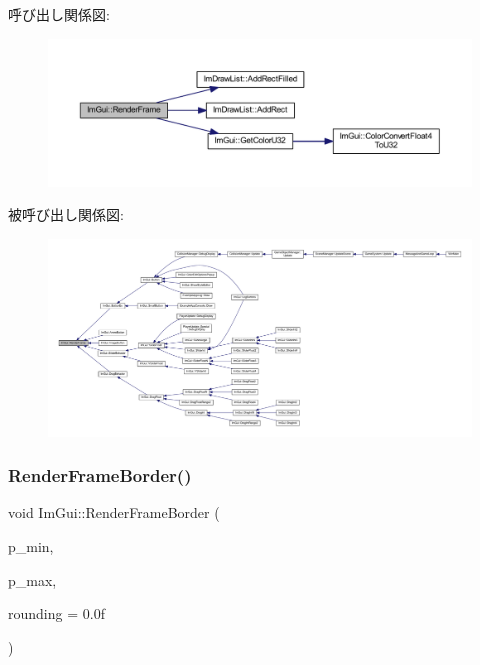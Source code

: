 呼び出し関係図\+:\nopagebreak
\begin{figure}[H]
\begin{center}
\leavevmode
\includegraphics[width=350pt]{namespace_im_gui_a621ba649568ede3939d4f10d83b86d04_cgraph}
\end{center}
\end{figure}
被呼び出し関係図\+:
\nopagebreak
\begin{figure}[H]
\begin{center}
\leavevmode
\includegraphics[width=350pt]{namespace_im_gui_a621ba649568ede3939d4f10d83b86d04_icgraph}
\end{center}
\end{figure}
\mbox{\label{namespace_im_gui_adc76239c2006e66f8dab7638529a763d}} 
\subsubsection{\texorpdfstring{Render\+Frame\+Border()}{RenderFrameBorder()}}
{\footnotesize\ttfamily void Im\+Gui\+::\+Render\+Frame\+Border (\begin{DoxyParamCaption}\item[{\mbox{\hyperlink{struct_im_vec2}{Im\+Vec2}}}]{p\+\_\+min,  }\item[{\mbox{\hyperlink{struct_im_vec2}{Im\+Vec2}}}]{p\+\_\+max,  }\item[{float}]{rounding = {\ttfamily 0.0f} }\end{DoxyParamCaption})}



